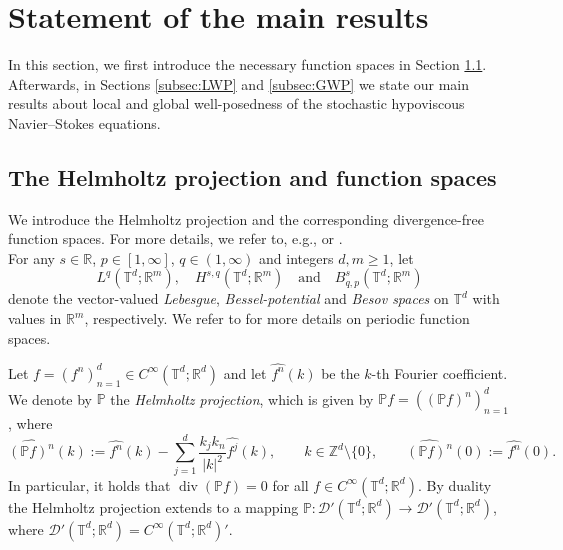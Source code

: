 \documentclass[11pt, a4paper,oneside, reqno]{amsart}
\theoremstyle{remark} %
\theoremstyle{definition} %
\numberwithin{theorem}{section}
\numberwithin{equation}{section}
\begin{document}
\section{Statement of the main results}\label{sec:mainresuls}
In this section, we first introduce the necessary function spaces in Section \ref{subsec:Helmholtz}. Afterwards, in Sections \ref{subsec:LWP} and \ref{subsec:GWP} we state our main results about local and global well-posedness of the stochastic hypoviscous Navier--Stokes equations.

\subsection{The Helmholtz projection and function spaces}\label{subsec:Helmholtz} 
We introduce the Helmholtz projection and the corresponding divergence-free function spaces. For more details, we refer to, e.g., \cite[Chapter III]{Ga11} or \cite[Chapter 2]{robinson2016three}.\\


For any $s\in\mathbb{R}$, $p\in[1,\infty]$, $q\in(1,\infty)$ and integers
$d,m\geq 1$, let
\[
L^q(\mathbb{T}^d;\mathbb{R}^m),\quad
H^{s,q}(\mathbb{T}^d;\mathbb{R}^m)
\quad\text{and}\quad
B^s_{q,p}(\mathbb{T}^d;\mathbb{R}^m)
\]
denote the vector-valued \emph{Lebesgue}, \emph{Bessel-potential} and \emph{Besov spaces} on $\mathbb{T}^d$
with values in $\mathbb{R}^m$, respectively. We refer to \cite[Chapter 3]{ST87} for more details on periodic function spaces.

Let $f=(f^n)_{n=1}^d\in C^\infty(\mathbb{T}^d;\mathbb{R}^d)$ and let  $\widehat{f^n}(k)$ be the $k$-th Fourier coefficient. We denote by $\mathbb{P}$ the \emph{Helmholtz projection}, which is given by
$\mathbb{P}f=((\mathbb{P}f)^n)_{n=1}^d$, where
\begin{equation*}
\widehat{(\mathbb{P}f)^n}(k)
:=
\widehat{f^n}(k)
-
\sum_{j=1}^d
\frac{k_jk_n}{|k|^2}\widehat{f^j}(k),
\qquad
k\in\mathbb{Z}^d\setminus\{0\},
\qquad
\widehat{(\mathbb{P}f)^n}(0)
:=
\widehat{f^n}(0).
\end{equation*}
In particular, it holds that $\operatorname{div}(\mathbb{P}f)=0$ for all $f\in C^\infty(\mathbb{T}^d;\mathbb{R}^d)$.
By duality the Helmholtz projection extends to a mapping 
$\mathbb{P}:
\mathscr{D}'(\mathbb{T}^d;\mathbb{R}^d)
\to
\mathscr{D}'(\mathbb{T}^d;\mathbb{R}^d)$, where $\mathscr{D}'(\mathbb{T}^d;\mathbb{R}^d)
=
C^\infty(\mathbb{T}^d;\mathbb{R}^d)'$.
\end{document}
